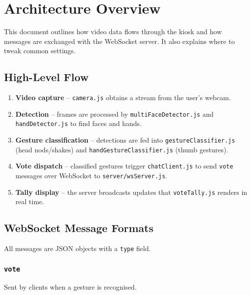\section{Architecture Overview}\label{architecture-overview}

This document outlines how video data flows through the kiosk and how
messages are exchanged with the WebSocket server. It also explains where
to tweak common settings.

\subsection{High-Level Flow}\label{high-level-flow}

\begin{enumerate}
\def\labelenumi{\arabic{enumi}.}
\tightlist
\item
  \textbf{Video capture} -- \texttt{camera.js} obtains a stream from the
  user's webcam.
\item
  \textbf{Detection} -- frames are processed by
  \texttt{multiFaceDetector.js} and \texttt{handDetector.js} to find
  faces and hands.
\item
  \textbf{Gesture classification} -- detections are fed into
  \texttt{gestureClassifier.js} (head nods/shakes) and
  \texttt{handGestureClassifier.js} (thumb gestures).
\item
  \textbf{Vote dispatch} -- classified gestures trigger
  \texttt{chatClient.js} to send \texttt{vote} messages over WebSocket
  to \texttt{server/wsServer.js}.
\item
  \textbf{Tally display} -- the server broadcasts updates that
  \texttt{voteTally.js} renders in real time.
\end{enumerate}

\subsection{WebSocket Message Formats}\label{websocket-message-formats}

All messages are JSON objects with a \texttt{type} field.

\subsubsection{\texorpdfstring{\texttt{vote}}{vote}}\label{vote}

Sent by clients when a gesture is recognised.

\begin{Shaded}
\begin{Highlighting}[]
\FunctionTok{\{} \FunctionTok{:} \FunctionTok{,} \FunctionTok{:}  \ErrorTok{|}  \FunctionTok{\}}
\end{Highlighting}
\end{Shaded}

